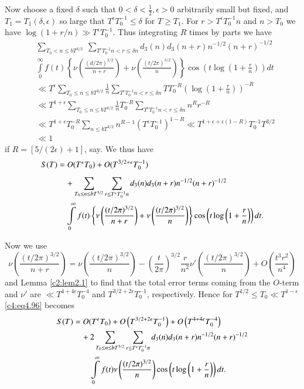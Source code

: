 Now choose a fixed $\delta$ such that $0 < \delta < \frac{1}{2},
\epsilon > 0$ arbitrarily small but fixed, and $T_1=T_1 (\delta,
\epsilon)$ so large that $T^\epsilon T_0^{-1} \leq \delta$ for $T \geq
T_1$. For $r > T^\epsilon T^{-1}_0n $ and $n > T_0$ we have $\log (1+
r/n) \gg T^\epsilon T_0^{-1}$. Thus integrating $R$ times by parts we
have 
\begin{align*}
&  \sum_{T_0 < n \leq bT^{3/2}}  ~\sum_{T^\epsilon T_0^{-1} n < r \leq
      \delta n} d_3 (n) d_3 (n+r) n^{-1/2} (n+r)^{-1/2} \\
& \int\limits_0^\infty   f(t) \left\{ \nu
  \left(\frac{(d/2\pi)^{3/2}}{n+r}\right) + \nu
  \left(\frac{(t/2\pi)^{3/2}}{n}\right)\right\} \cos \left(t \log
  \left( 1+ \frac{r}{n}\right) \right)dt\\
& \ll T^\epsilon \sum_{T_0 \leq n \leq bT^{3/2}} \frac{1}{n}
  \sum_{T^\epsilon T_0^{-1} n < r \leq \delta n} TT^{-R}_0  \left(\log
  \left(1+ \frac{r}{n} \right)\right)^{-R}\\
& \ll T^{1+\epsilon} \sum_{T_0 \leq n \leq bT^{3/2}} \frac{1}{n}
  T_0^{-R} \sum_{T^\epsilon T_0^{-1} n < r \leq \delta n} n^R r^{-R}\\
& \ll T^{1+ \epsilon}T_0^{-R} \sum_{n \leq bT^{3/2}} n^{R-1} (T^\epsilon
  T_0^{-1})^{1-R} \ll T^{1+\epsilon + \epsilon (1-R)}
  T_0^{-1}T^{3/2}\\
& \ll 1
\end{align*}
if $R= [5/(2\epsilon)+1]$, say. We thus have
\begin{align}
   S(T)  &= O(T^\epsilon T_0) + O(T^{3/2+\epsilon}
  T_0^{-1})\label{c4:eq4.96}\\[5pt] 
  &\quad +\sum_{T_0
  \leq n \leq bT^{3/2}}  \sum_{r \leq T^\epsilon T_0^{-1} n} d_3 (n)
  d_3 (n+r)n^{-1/2} (n+r)^{-1/2}\notag\\
   &\quad \int\limits_0^\infty f(t) \left\{ \nu \left(\frac{(
    t/2\pi)^{3/2}}{n+r} \right) + \nu
  \left(\frac{(t/2\pi)^{3/2}}{n}\right)\right\} \cos \left(t \log
  \left(1+ \frac{r}{n} \right)\right)dt.\notag
\end{align}

Now we use 
$$ 
\nu \left(\frac{(t/2\pi)^{3/2}}{n+r} \right) = \nu
\left(\frac{(t/2\pi)^{3/2}}{n}\right) - \left(\frac{t}{2 \pi}
\right)^{3/2} \frac{r}{n^2} \nu' \left(\frac{(t/2\pi)^{3/2}}{n}
\right) + O\left(\frac{t^3 r^2}{n^4} \right)
$$
and Lemma \ref{c2:lem2.1} to find that the total error terms coming
from the $O$-term and $\nu'$ are $\ll T^{4+ 4\epsilon}T^{-4}_0$ and
$T^{3/2+ 2 \epsilon} T^{-1}_0$, respectively. Hence for $T^{1/2} \leq
T_0 \ll T^{1- \epsilon}$ \eqref{c4:eq4.96} becomes
\begin{align}
  S(T)& = O (T^\epsilon T_0) + O\left(T^{3/2 + 2
    \epsilon}T_0^{-1}\right)+ O\left(T^{4+ 4 \epsilon}
  T_0^{-4}\right)\label{c4:eq4.97}\\ 
  & \quad +2 \sum_{T_0 \leq n \leq b T^{3/2}} \sum_{r \leq
    T^\epsilon T_0^{-1}\pi} d_3 (n) d_3 (n+r) n^{-1/2} (n+r)^{-1/2}\notag\\
  & \quad\quad \int\limits_0^\infty f(t) \nu
  \left(\frac{(t/2\pi)^{3/2}}{n} \right)  \cos \left(t \log \left(1+
  \frac{r}{n} \right) \right)dt. \notag 
\end{align}

